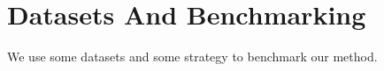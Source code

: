 \section{Datasets And Benchmarking}
\label{sec:datasets-and-distance-functions}

We use some datasets and some strategy to benchmark our method.
